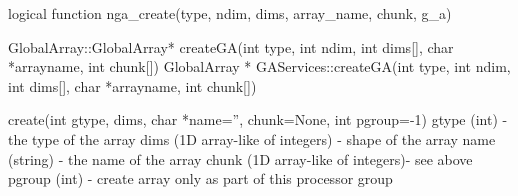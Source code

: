 \documentclass[12pt]{article}
\begin{document}
\begin{fapi}
\begin{fcode}
logical function nga_create(type, ndim, dims, array_name, chunk, g_a)
\end{fcode}
\begin{funcargs}
\end{funcargs}
\end{fapi}

\begin{cxxapi}
\begin{cxxcode}
GlobalArray::GlobalArray* createGA(int type, int ndim, int dims[],
                                   char *arrayname, int chunk[])
GlobalArray * GAServices::createGA(int type, int ndim, int dims[],
                                   char *arrayname, int chunk[])
\end{cxxcode}
\begin{funcargs}
\end{funcargs}
\end{cxxapi}

\begin{pyapi}
\begin{pycode}
create(int gtype, dims, char *name='', chunk=None, int pgroup=-1)
   gtype (int)                      - the type of the array
   dims (1D array-like of integers) - shape of the array
   name (string)                    - the name of the array
   chunk (1D array-like of integers)- see above
   pgroup (int)                     - create array only as part of
                                      this processor group
\end{pycode}
\end{pyapi}

\dcoll
\end{document}
